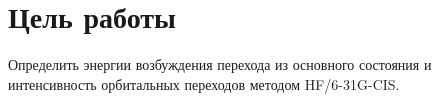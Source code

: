 \section{Цель работы}
Определить энергии возбуждения перехода из основного состояния и интенсивность орбитальных переходов методом HF/6-31G-CIS.
